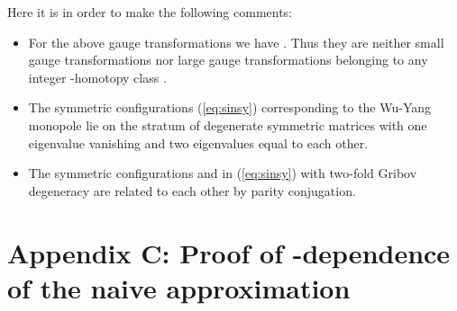 \documentclass[a4paper,12pt]{article}
\begin{document}
Here it is in order to make the following comments:
\begin{itemize}
\item
For the above gauge transformations we have \coordHE{}.
Thus they are neither small gauge transformations nor
large gauge transformations belonging to any integer \coordHE{}-homotopy class
\cite{Jackiw}.
\item
The symmetric configurations (\ref{eq:sinsy}) corresponding to the
Wu-Yang monopole lie on the stratum of degenerate symmetric matrices
with one eigenvalue vanishing and two eigenvalues equal to each other.
\item
The symmetric configurations \coordHE{} and \coordHE{} in (\ref{eq:sinsy})
with two-fold Gribov degeneracy
are related to each other by parity conjugation.
\end{itemize}



\section*{Appendix C: Proof of
\myHighlight{$\theta$}\coordHE{}-dependence of the naive \coordHE{} approximation }

\label{ap:C}
\end{document}
